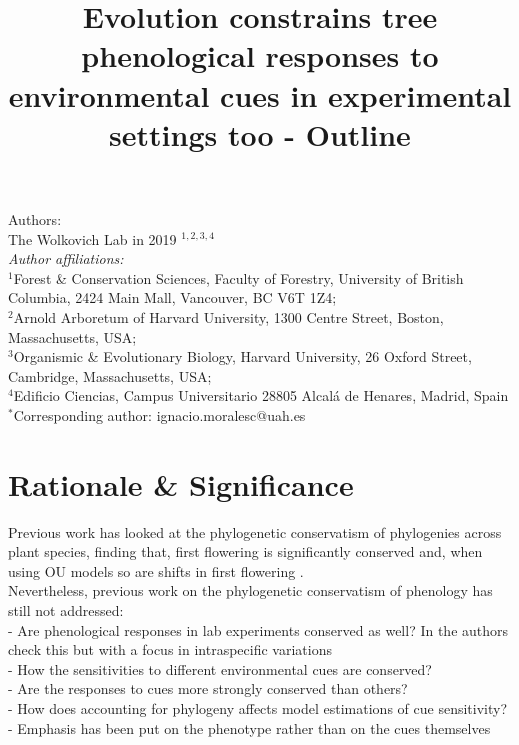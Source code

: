 \documentclass{article}\usepackage[]{graphicx}\usepackage[]{color}
\title{Evolution constrains tree phenological responses to environmental cues in experimental settings too - Outline}
\begin{document}
\maketitle

\noindent Authors:\\
The Wolkovich Lab in 2019 $^{1,2,3,4}$
\vspace{2ex}\\
\emph{Author affiliations:}\\
$^{1}$Forest \& Conservation Sciences, Faculty of Forestry, University of British Columbia, 2424 Main Mall, Vancouver, BC V6T 1Z4;\\
$^{2}$Arnold Arboretum of Harvard University, 1300 Centre Street, Boston, Massachusetts, USA;\\
$^{3}$Organismic \& Evolutionary Biology, Harvard University, 26 Oxford Street, Cambridge, Massachusetts, USA;\\
$^{4}$Edificio Ciencias, Campus Universitario 28805 Alcalá de Henares, Madrid, Spain\\
 

\vspace{2ex}
$^*$Corresponding author: ignacio.moralesc@uah.es\\
\renewcommand{\thetable}{\arabic{table}}
\renewcommand{\thefigure}{\arabic{figure}}
\renewcommand{\labelitemi}{$-$}

\clearpage
\section*{Rationale \& Significance}

Previous work has looked at the phylogenetic conservatism of phylogenies across plant species, finding that, first flowering is significantly conserved \citep{davies2013phylogenetic} and, when using OU models so are shifts in first flowering \citep{rafferty2017global}.\\ 

Nevertheless, previous work on the phylogenetic conservatism of phenology has still not addressed:\\
- Are phenological responses in lab experiments conserved as well? In \cite{joly2019importance} the authors check this but with a focus in intraspecific variations\\
- How the sensitivities to different environmental cues are conserved?\\
- Are the responses to cues more strongly conserved than others?\\
- How does accounting for phylogeny affects model estimations of cue sensitivity?\\
- Emphasis has been put on the phenotype rather than on the cues themselves\\
\end{document}
